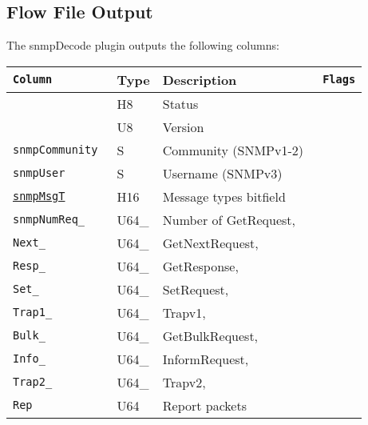 \documentclass[documentation]{subfiles}
\begin{document}
\subsection{Flow File Output}
The snmpDecode plugin outputs the following columns:
\begin{longtable}{>{\tt}lll>{\tt\small}l}
    \toprule
    {\bf Column}                   & {\bf Type}   & {\bf Description}       & {\bf Flags}\\
    \midrule\endhead%
    \nameref{snmpStat}             & H8           & Status                  & \\
    \nameref{snmpVersion}          & U8           & Version                 & \\
    snmpCommunity                  & S            & Community (SNMPv1-2)    & \\
    snmpUser                       & S            & Username (SNMPv3)       & \\
    \hyperref[snmpTypes]{snmpMsgT} & H16          & Message types bitfield  & \\
    snmpNumReq\_                   & U64\_        & Number of GetRequest,   & \\
    \qquad Next\_                  & \qquad U64\_ & \qquad GetNextRequest,  & \\
    \qquad Resp\_                  & \qquad U64\_ & \qquad GetResponse,     & \\
    \qquad Set\_                   & \qquad U64\_ & \qquad SetRequest,      & \\
    \qquad Trap1\_                 & \qquad U64\_ & \qquad Trapv1,          & \\
    \qquad Bulk\_                  & \qquad U64\_ & \qquad GetBulkRequest,  & \\
    \qquad Info\_                  & \qquad U64\_ & \qquad InformRequest,   & \\
    \qquad Trap2\_                 & \qquad U64\_ & \qquad Trapv2,          & \\
    \qquad Rep                     & \qquad U64   & \qquad Report packets   & \\
    \bottomrule
\end{longtable}
\end{document}

